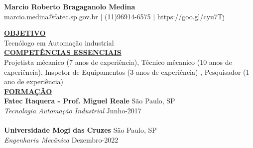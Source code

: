 \documentclass{article}
\begin{document}
\begin{center}
\thispagestyle{empty}
\large \textbf{Marcio Roberto Bragaganolo Medina \\}
\normalsize marcio.medina@fatec.sp.gov.br $\mid$ (11)96914-6575 $\mid$ https://goo.gl/cyu7Tj   \\
\hrulefill
\end{center}


\noindent \textbf{\underline{OBJETIVO}} \\
\noindent Tecnólogo em Automação industrial \\


\noindent \textbf{\underline{COMPETÊNCIAS ESSENCIAIS}} \\
Projetista mêcanico (7 anos de experiência), Técnico mêcanico (10 anos de experiência), Inspetor de Equipamentos (3 anos de experiência) , Pesquisador (1 ano de experiência) \\

\noindent \textbf{\underline{FORMAÇÂO}} \\
\textbf{Fatec Itaquera - Prof. Miguel Reale} \hfill São Paulo, SP \\
\textit{Tecnologia Automação Industrial} \hfill Junho-2017\\ \\
\textbf{Universidade Mogi das Cruzes} \hfill São Paulo, SP \\
\textit{Engenharia Mecânica} \hfill Dezembro-2022 \\
\end{document}
